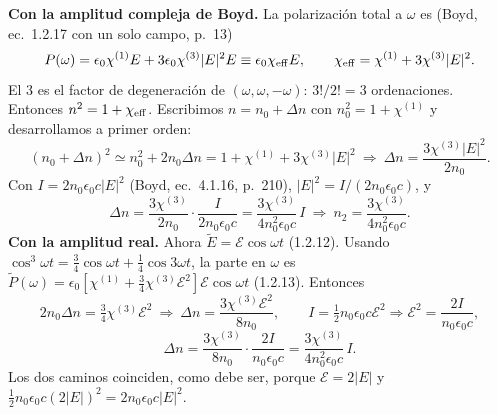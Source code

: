  \textbf{Con la amplitud compleja de Boyd.} La polarización total a $\omega$ es (Boyd, ec.~1.2.17 con un solo campo, p.~13)
\[
P(\omega)=\epsilon_0\chi^{(1)}E+3\epsilon_0\chi^{(3)}|E|^2E\equiv\epsilon_0\chi_{\rm eff}E,\qquad \chi_{\rm eff}=\chi^{(1)}+3\chi^{(3)}|E|^2.
\]
El 3 es el factor de degeneración de $(\omega,\omega,-\omega)$: $3!/2!=3$ ordenaciones. Entonces $n^2=1+\chi_{\rm eff}$. Escribimos $n=n_0+\Delta n$ con
$n_0^2=1+\chi^{(1)}$ y desarrollamos a primer orden:
\[
(n_0+\Delta n)^2\simeq n_0^2+2n_0\Delta n=1+\chi^{(1)}+3\chi^{(3)}|E|^2\ \Rightarrow\ \Delta n=\frac{3\chi^{(3)}|E|^2}{2n_0}.
\]
Con $I=2n_0\epsilon_0c|E|^2$ (Boyd, ec.~4.1.16, p.~210), $|E|^2=I/(2n_0\epsilon_0c)$, y
\[
\Delta n=\frac{3\chi^{(3)}}{2n_0}\cdot\frac{I}{2n_0\epsilon_0c}=\frac{3\chi^{(3)}}{4n_0^2\epsilon_0c}\,I\ \Rightarrow\ n_2=\frac{3\chi^{(3)}}{4n_0^2\epsilon_0c}.
\]
\textbf{Con la amplitud real.} Ahora $\tilde E=\mathcal E\cos\omega t$ (1.2.12). Usando $\cos^3\omega t=\frac34\cos\omega t+\frac14\cos3\omega t$, la parte en $\omega$ es
$\tilde P(\omega)=\epsilon_0[\chi^{(1)}+\frac34\chi^{(3)}\mathcal E^2]\mathcal E\cos\omega t$ (1.2.13). Entonces
\[
2n_0\Delta n=\tfrac34\chi^{(3)}\mathcal E^2\ \Rightarrow\ \Delta n=\frac{3\chi^{(3)}\mathcal E^2}{8n_0},\qquad
I=\tfrac12n_0\epsilon_0c\mathcal E^2\Rightarrow\mathcal E^2=\frac{2I}{n_0\epsilon_0c},
\]
\[
\Delta n=\frac{3\chi^{(3)}}{8n_0}\cdot\frac{2I}{n_0\epsilon_0c}=\frac{3\chi^{(3)}}{4n_0^2\epsilon_0c}\,I.
\]
Los dos caminos coinciden, como debe ser, porque $\mathcal E=2|E|$ y $\frac12n_0\epsilon_0c(2|E|)^2=2n_0\epsilon_0c|E|^2$.

